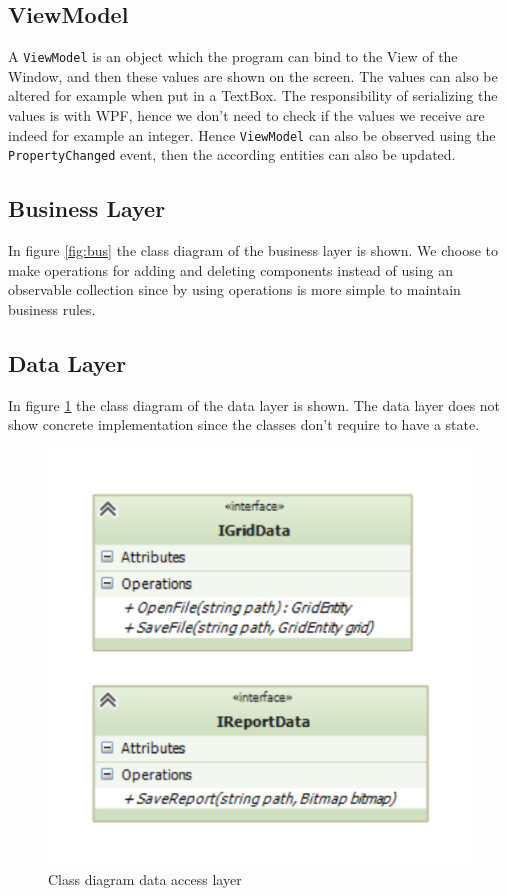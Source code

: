 \subsection{ViewModel}
A \texttt{ViewModel} is an object which the program can bind to the View of the Window, and then these values are shown on the screen. The values can also be altered for example when put in a TextBox. The responsibility of serializing the values is with WPF, hence we don't need to check if the values we receive are indeed for example an integer. Hence \texttt{ViewModel} can also be observed using the \texttt{PropertyChanged} event, then the according entities can also be updated. 

\subsection{Business Layer}
In figure \ref{fig:bus} the class diagram of the business layer is shown. We choose to make operations for adding and deleting components instead of using an observable collection since by using operations is more simple to maintain business rules. 

\subsection{Data Layer}
In figure \ref{fig:data} the class diagram of the data layer is shown. The data layer does not show concrete implementation since the classes don't require to have a state.

\newpage
\begin{figure}[!ht]
	\centering
	\includegraphics{figures/DataLayer}
	\caption{Class diagram data access layer}
	\label{fig:data}
\end{figure}



